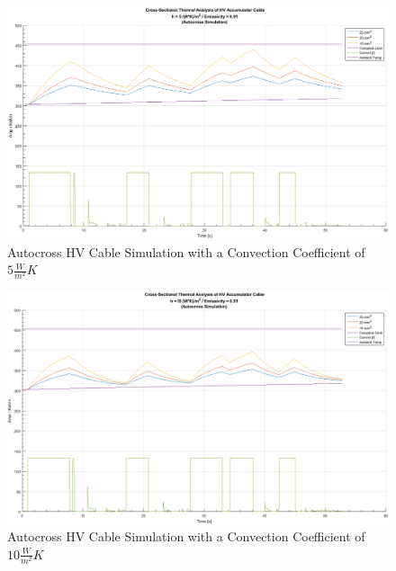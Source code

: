 \documentclass[12pt,a4paper,oneside]{memoir}
\begin{document}
\begin{table}[H]
  \centering
  \captionsetup{aboveskip=0pt,font=it}
  \caption{Coroplast Characteristics}
    \end{table}
    
\newpage
\begin{figure}[p]
\centerfloat
\includegraphics[width=1.0\textwidth]{Wire_Cross_Sectional_5h}
\captionsetup{aboveskip=0pt,font=it}
\caption{Autocross HV Cable Simulation with a Convection Coefficient of $5 \frac{W}{m^2}K$}
\label{Fig1}
\end{figure}

\newpage
\begin{figure}[p]
\vfill
\centerfloat
\includegraphics[width=1.0\textwidth]{Wire_Cross_Sectional_10h}
\captionsetup{aboveskip=0pt,font=it}
\caption{Autocross HV Cable Simulation with a Convection Coefficient of $10 \frac{W}{m^2}K$}
\label{Fig1}
\end{figure}
\end{document}
